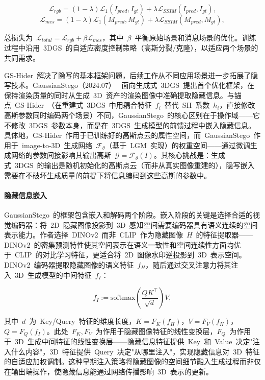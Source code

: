 \begin{equation}
    \mathcal{L}_{rgb} = (1-\lambda)\mathcal{L}_1(I_{pred}, I_{gt}) + \lambda \mathcal{L}_{SSIM}(I_{pred}, I_{gt}),
\end{equation}
\begin{equation}
    \mathcal{L}_{mes} = (1-\lambda)\mathcal{L}_1(M_{pred}, M_{gt}) + \lambda \mathcal{L}_{SSIM}(M_{pred}, M_{gt}),
\end{equation}

总损失为~$\mathcal{L}_{total} = \mathcal{L}_{rgb} + \beta \mathcal{L}_{mes}$，其中~$\beta$~平衡原始场景和消息场景的优化。训练过程中沿用~3DGS~的自适应密度控制策略（高斯分裂/克隆），以适应两个场景的共同需求。

GS-Hider~解决了隐写的基本框架问题，后续工作从不同应用场景进一步拓展了隐写技术。GaussianStego（2024.07）~\cite{2407_01301} 面向生成式~3DGS~提出首个优化框架，在保持渲染质量的同时从生成~3D~资产的渲染图像中准确提取隐藏信息。与锚点~GS-Hider~（在重建式~3DGS~中用耦合特征~$f_i$~替代~SH~系数~$h_i$，直接修改高斯参数同时编码两个场景）不同，GaussianStego~的核心区别在于操作域——它不修改~3DGS~参数本身，而是在~3DGS~生成模型的前馈过程中嵌入隐藏信息。具体地，GS-Hider~作用于已训练好的高斯点云的属性空间，而~GaussianStego~作用于~image-to-3D~生成网络~$\mathcal{F}_\theta$（基于~LGM~实现）的权重空间——通过微调生成网络的参数间接影响其输出高斯~$\mathcal{G} = \mathcal{F}_\theta(I)$。其核心挑战是：生成式~3DGS~的输出是随机初始化的高斯点云（而非从真实图像重建的），隐写嵌入需要在不破坏生成质量的前提下将信息编码到这些高斯的参数中。

\paragraph{隐藏信息嵌入}GaussianStego~的框架包含嵌入和解码两个阶段。嵌入阶段的关键是选择合适的视觉编码器：将~2D~隐藏图像投影到~3D~感知空间需要编码器具有语义连续的空间表示能力。作者选择~DINOv2~而非~CLIP~作为隐藏图像~$H$~的特征提取器——DINOv2~的密集预测特性使其空间表示在语义一致性和空间连续性方面均优于~CLIP~的对比学习特征，更适合将~2D~图像水印逆投影到~3D~表示空间。DINOv2~编码器提取隐藏图像的语义特征~$f_H$，随后通过交叉注意力将其注入~3D~生成模型的中间特征~$f_I$：

\begin{equation}
    f_I := \mathrm{softmax}\!\left(\frac{Q K^\top}{\sqrt{d}}\right) V,
\end{equation}

其中~$d$~为~Key/Query~特征的维度长度，$K = F_K(f_H)$，$V = F_V(f_H)$，$Q = F_Q(f_I)$。此处~$F_K, F_V$~为作用于隐藏图像特征的线性变换层，$F_Q$~为作用于~3D~生成中间特征的线性变换层——隐藏信息特征提供~Key~和~Value~决定"注入什么内容"，3D~特征提供~Query~决定"从哪里注入"，实现隐藏信息对~3D~特征的自适应加权调制。这种早期注入策略将隐藏图像的空间细节融入生成过程而非仅在输出端操作，使隐藏信息能通过网络传播影响~3D~表示的更新。

